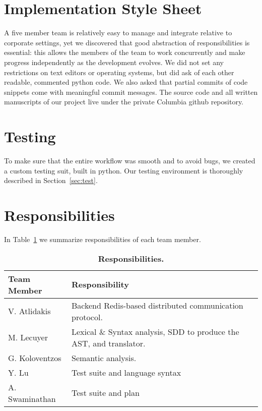 \section{Implementation Style Sheet}
A five member team is relatively easy to manage and integrate relative to
corporate settings, yet we discovered that good abstraction of responsibilities
is essential: this allows the members of the team to work concurrently and make
progress independently as the development evolves.  We did not set any
restrictions on text editors or operating systems, but did ask of each other
readable, commented python code. We also asked that partial commits of
code snippets come with meaningful commit messages. The source code and all
written manuscripts of our project live under the private Columbia github
repository.

\section{Testing}
To make sure that the entire workflow was smooth and to avoid bugs, we created
a
custom testing suit, built in python. Our testing environment is thoroughly
described in Section~\ref{sec:test}.

\section{Responsibilities}
In Table~\ref{tab:resp} we summarize responsibilities of each team member.
\begin{table}[!h]
{%
 \begin{center}
    \begin{tabular}{ | l || l |}
    \hline
    \textbf{Team Member} & \textbf{Responsibility} \\
    \hline
    \hline
    V. Atlidakis & Backend Redis-based distributed communication protocol.\\ \hline
    M. Lecuyer & Lexical \& Syntax analysis, SDD to produce the AST, and translator. \\ \hline
    G. Koloventzos & Semantic analysis. \\ \hline
    Y. Lu & Test suite and language syntax \\ \hline
    A. Swaminathan  & Test suite and plan \\ \hline
    \hline
    \end{tabular}
    \caption{\textbf{Responsibilities.}}
    \label{tab:resp}
 \end{center}
}
\end{table}

